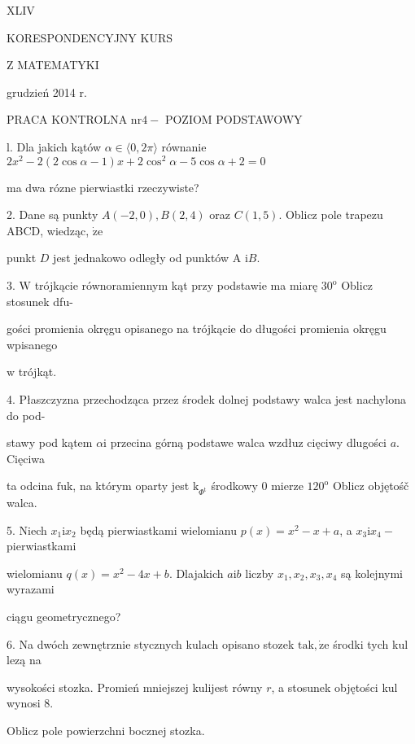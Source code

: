 \documentclass[a4paper,12pt]{article}
\begin{document}
XLIV

KORESPONDENCYJNY KURS

Z MATEMATYKI

grudzień 2014 r.

PRACA KONTROLNA $\mathrm{n}\mathrm{r} 4-$ POZIOM PODSTAWOWY

l. Dla jakich kątów $\alpha\in\langle 0,  2\pi\rangle$ równanie $2x^{2}-2(2\cos\alpha-1)x+2\cos^{2}\alpha-5\cos\alpha+2=0$

ma dwa rózne pierwiastki rzeczywiste?

2. Dane są punkty $A(-2,0), B(2,4)$ oraz $C(1,5)$. Oblicz pole trapezu ABCD, wiedząc, $\dot{\mathrm{z}}\mathrm{e}$

punkt $D$ jest jednakowo odległy od punktów A $\mathrm{i}B.$

3. $\mathrm{W}$ trójkącie równoramiennym kąt przy podstawie ma miarę $30^{\mathrm{o}}$ Oblicz stosunek dfu-

gości promienia okręgu opisanego na trójkącie do długości promienia okręgu wpisanego

$\mathrm{w}$ trójkąt.

4. Płaszczyzna przechodząca przez środek dolnej podstawy walca jest nachylona do pod-

stawy pod kątem $\alpha \mathrm{i}$ przecina górną podstawe walca wzdłuz cięciwy dlugości $a$. Cięciwa

ta odcina $\mathrm{f}\mathrm{u}\mathrm{k}$, na którym oparty jest $\mathrm{k}_{\Phi^{\mathrm{t}}}$ środkowy $0$ mierze $120^{\mathrm{o}}$ Oblicz objętośč walca.

5. Niech $x_{1}\mathrm{i}x_{2}$ będą pierwiastkami wielomianu $p(x)=x^{2}-x+a$, a $x_{3}\mathrm{i}x_{4}-$ pierwiastkami

wielomianu $q(x)=x^{2}-4x+b$. Dlajakich $a\mathrm{i}b$ liczby $x_{1}, x_{2}, x_{3}, x_{4}$ są kolejnymi wyrazami

ciągu geometrycznego?

6. Na dwóch zewnętrznie stycznych kulach opisano stozek $\mathrm{t}\mathrm{a}\mathrm{k}, \dot{\mathrm{z}}\mathrm{e}$ środki tych kul lezą na

wysokości stozka. Promień mniejszej kulijest równy $r$, a stosunek objętości kul wynosi 8.

Oblicz pole powierzchni bocznej stozka.
\end{document}
